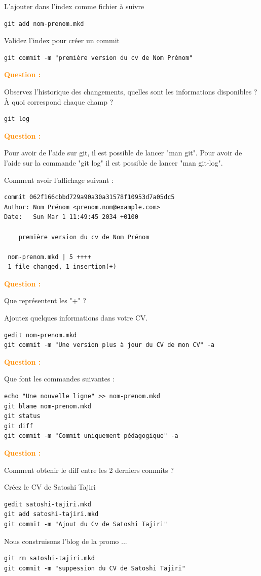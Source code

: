 \documentclass[a4paper]{article}
\newcounter{question}
\newcommand{\q}{
  \textcolor{DarkOrange}{\textbf{Question \thequestion : }}
  \addtocounter{question}{1}
  \newline
}
\begin{document}
L'ajouter dans l'index comme fichier à suivre
\begin{verbatim}
git add nom-prenom.mkd
\end{verbatim}

Validez l'index pour créer un commit
\begin{verbatim}
git commit -m "première version du cv de Nom Prénom"
\end{verbatim}

\q Observez l'historique des changements, quelles sont les informations disponibles ? À quoi correspond chaque champ ?
\begin{verbatim}
git log
\end{verbatim}

\q Pour avoir de l'aide sur git, il est possible de lancer "man git". Pour
avoir de l'aide sur la commande "git log" il est possible de lancer "man
git-log".

Comment avoir l'affichage suivant : 
\begin{verbatim}
commit 062f166cbbd729a90a30a31578f10953d7a05dc5
Author: Nom Prénom <prenom.nom@example.com>
Date:   Sun Mar 1 11:49:45 2034 +0100

    première version du cv de Nom Prénom

 nom-prenom.mkd | 5 ++++
 1 file changed, 1 insertion(+)
\end{verbatim}

\q Que représentent les "+"  ?

Ajoutez quelques informations dans votre CV.
\begin{verbatim}
gedit nom-prenom.mkd
git commit -m "Une version plus à jour du CV de mon CV" -a
\end{verbatim}

\q Que font les commandes suivantes :
\begin{verbatim}
echo "Une nouvelle ligne" >> nom-prenom.mkd
git blame nom-prenom.mkd
git status
git diff
git commit -m "Commit uniquement pédagogique" -a
\end{verbatim}

\q Comment obtenir le diff entre les 2 derniers commits ?

Créez le CV de Satoshi Tajiri
\begin{verbatim}
gedit satoshi-tajiri.mkd
git add satoshi-tajiri.mkd
git commit -m "Ajout du Cv de Satoshi Tajiri"
\end{verbatim}

Nous construisons l'blog de la promo ... 
\begin{verbatim}
git rm satoshi-tajiri.mkd
git commit -m "suppession du CV de Satoshi Tajiri"
\end{verbatim}
\end{document}
